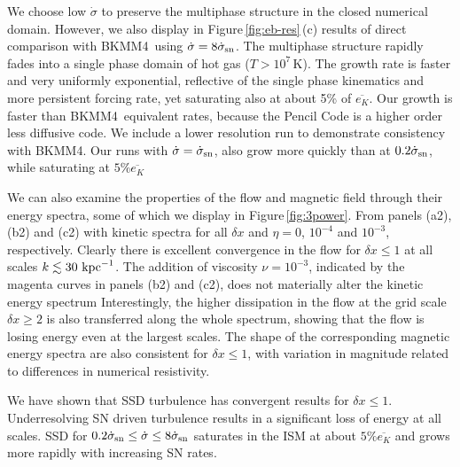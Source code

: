 \documentclass[preprint2]{aastex63}
\newcommand\SNr{\dot\sigma_{\rm sn}}
\newcommand\kpc{~ {\rm kpc}}
\newcommand\dx{ {\delta x}}
\newcommand\BKM{{\sf BKMM4}}
\newcommand{\fg}[1]{\textcolor{midgreen}{#1}}
\begin{document}
 \fg{We choose low $\dot\sigma$ to preserve the multiphase structure in the 
 closed numerical domain. 
 However, we also display in Figure\,\ref{fig:eb-res}\,(c) results of direct
 comparison with \BKM\ using $\dot\sigma=8\SNr$.
 The multiphase structure rapidly fades into a single phase domain of hot gas
 ($T>10^7$\,K).
 The growth rate is faster and very uniformly exponential, reflective of the
 single phase kinematics and more persistent forcing rate, yet saturating
 also at about 5\% of $\overline{e_K}$.
 Our growth is faster than \BKM\ equivalent rates, because the Pencil Code is a
 higher order less diffusive code.
 We include a lower resolution run to demonstrate consistency with \BKM.
 Our runs with $\dot\sigma=\SNr$, also grow more quickly than at $0.2\SNr$,
 while saturating at $5\%\overline{e_K}$}%

 \fg{We can also examine the properties of the flow and magnetic field through
 their energy spectra, some of which we display in Figure\,\ref{fig:3power}.
 From panels (a2), (b2) and (c2) with kinetic spectra for all $\dx$ and 
 $\eta=0$, $10^{-4}$ and $10^{-3}$, respectively.
 Clearly there is excellent convergence in the flow for $\dx\leq1$ at all
 scales $k\lesssim 30\kpc^{-1}$.
 The addition of viscosity $\nu=10^{-3}$, indicated by the magenta curves in
 panels (b2) and (c2), does not materially alter the kinetic energy spectrum
 Interestingly, the higher dissipation in the flow at the grid scale 
 $\dx\geq2$ is also transferred along the whole spectrum, showing that
 the flow is losing energy even at the largest scales.
 The shape of the corresponding magnetic energy spectra are also consistent 
 for $\dx\leq1$, with variation in magnitude related to differences in
 numerical resistivity.
}
 
 \fg{We have shown that SSD turbulence has convergent results for $\dx\leq1$.
 Underresolving SN driven turbulence results in a significant loss of energy
 at all scales.
 SSD for $0.2\SNr\leq \dot\sigma \leq 8\SNr$ saturates in the ISM at about
 $5\%\overline{e_K}$ and grows more rapidly with increasing SN rates.
 } 
\end{document}
